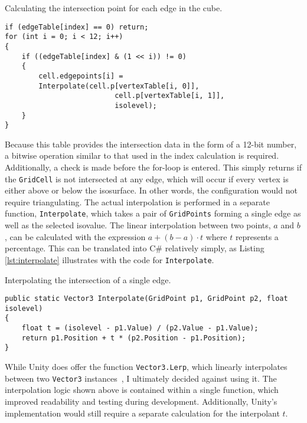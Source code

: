 \documentclass[pageno]{jpaper}
\begin{document}
\begin{listing}[H]
\linespread{1.0}
\caption{Calculating the intersection point for each edge in the cube.}
\begin{verbatim}
if (edgeTable[index] == 0) return;
for (int i = 0; i < 12; i++)
{
    if ((edgeTable[index] & (1 << i)) != 0)
    {
        cell.edgepoints[i] = 
        Interpolate(cell.p[vertexTable[i, 0]], 
                          cell.p[vertexTable[i, 1]], 
                          isolevel);
    }
}
\end{verbatim}
\label{lst:intersection}
\end{listing}

Because this table provides the intersection data in the form of a 12-bit number, a bitwise operation similar to that used in the index calculation is required. Additionally, a check is made before the for-loop is entered. This simply returns if the \texttt{GridCell} is not intersected at any edge, which will occur if every vertex is either above or below the isosurface. In other words, the configuration would not require triangulating. The actual interpolation is performed in a separate function, \texttt{Interpolate}, which takes a pair of \texttt{GridPoints} forming a single edge as well as the selected isovalue. The linear interpolation between two points, $a$ and $b$, can be calculated with the expression $a + (b-a) \cdot t$ where $t$ represents a percentage. This can be translated into C\# relatively simply, as Listing \ref{lst:interpolate} illustrates with the code for \texttt{Interpolate}.

\begin{listing}[H]
\linespread{1.0}
\caption{Interpolating the intersection of a single edge.}
\begin{verbatim}
public static Vector3 Interpolate(GridPoint p1, GridPoint p2, float isolevel)
{
    float t = (isolevel - p1.Value) / (p2.Value - p1.Value);
    return p1.Position + t * (p2.Position - p1.Position);
}
\end{verbatim}
\label{lst:interpolate}
\end{listing}

While Unity does offer the function \texttt{Vector3.Lerp}, which linearly interpolates between two \texttt{Vector3} instances~\cite{unitylerp}, I ultimately decided against using it. The interpolation logic shown above is contained within a single function, which improved readability and testing during development. Additionally, Unity's implementation would still require a separate calculation for the interpolant $t$.
\end{document}
